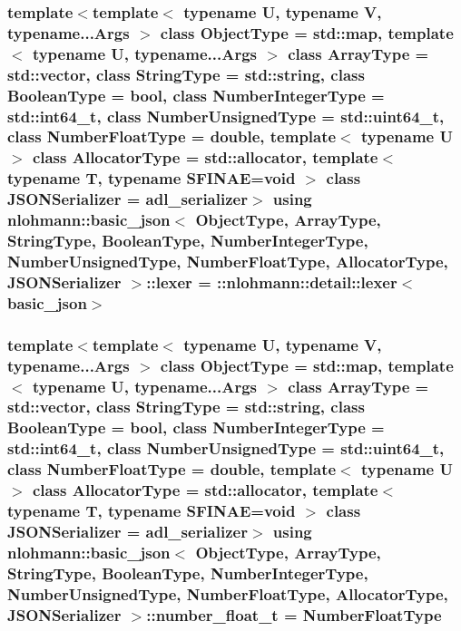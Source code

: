 \subsubsection[{\texorpdfstring{lexer}{lexer}}]{\setlength{\rightskip}{0pt plus 5cm}template$<$template$<$ typename U, typename V, typename...\+Args $>$ class Object\+Type = std\+::map, template$<$ typename U, typename...\+Args $>$ class Array\+Type = std\+::vector, class String\+Type  = std\+::string, class Boolean\+Type  = bool, class Number\+Integer\+Type  = std\+::int64\+\_\+t, class Number\+Unsigned\+Type  = std\+::uint64\+\_\+t, class Number\+Float\+Type  = double, template$<$ typename U $>$ class Allocator\+Type = std\+::allocator, template$<$ typename T, typename S\+F\+I\+N\+A\+E=void $>$ class J\+S\+O\+N\+Serializer = adl\+\_\+serializer$>$ using {\bf nlohmann\+::basic\+\_\+json}$<$ Object\+Type, Array\+Type, String\+Type, Boolean\+Type, Number\+Integer\+Type, Number\+Unsigned\+Type, Number\+Float\+Type, Allocator\+Type, J\+S\+O\+N\+Serializer $>$\+::{\bf lexer} =  \+::{\bf nlohmann\+::detail\+::lexer}$<${\bf basic\+\_\+json}$>$\hspace{0.3cm}{\ttfamily [private]}}\hypertarget{classnlohmann_1_1basic__json_a163540181fa07868de2902ecdb6df2ae}{}\label{classnlohmann_1_1basic__json_a163540181fa07868de2902ecdb6df2ae}
\subsubsection[{\texorpdfstring{number\+\_\+float\+\_\+t}{number_float_t}}]{\setlength{\rightskip}{0pt plus 5cm}template$<$template$<$ typename U, typename V, typename...\+Args $>$ class Object\+Type = std\+::map, template$<$ typename U, typename...\+Args $>$ class Array\+Type = std\+::vector, class String\+Type  = std\+::string, class Boolean\+Type  = bool, class Number\+Integer\+Type  = std\+::int64\+\_\+t, class Number\+Unsigned\+Type  = std\+::uint64\+\_\+t, class Number\+Float\+Type  = double, template$<$ typename U $>$ class Allocator\+Type = std\+::allocator, template$<$ typename T, typename S\+F\+I\+N\+A\+E=void $>$ class J\+S\+O\+N\+Serializer = adl\+\_\+serializer$>$ using {\bf nlohmann\+::basic\+\_\+json}$<$ Object\+Type, Array\+Type, String\+Type, Boolean\+Type, Number\+Integer\+Type, Number\+Unsigned\+Type, Number\+Float\+Type, Allocator\+Type, J\+S\+O\+N\+Serializer $>$\+::{\bf number\+\_\+float\+\_\+t} =  Number\+Float\+Type}\hypertarget{classnlohmann_1_1basic__json_a88d6103cb3620410b35200ee8e313d97}{}\label{classnlohmann_1_1basic__json_a88d6103cb3620410b35200ee8e313d97}


